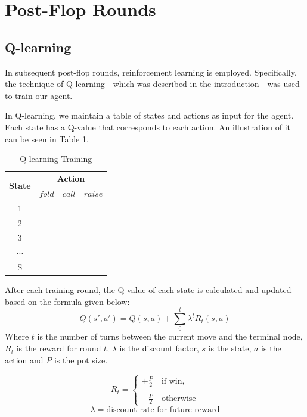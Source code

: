 \documentclass{article}
\begin{document}
\section{Post-Flop Rounds}

\subsection{Q-learning}

In subsequent post-flop rounds, reinforcement learning is employed. Specifically, the technique of Q-learning - which was described in the introduction - was used to train our agent.

In Q-learning, we maintain a table of states and actions as input for the agent. Each state has a Q-value that corresponds to each action. An illustration of it can be seen in Table 1.

\begin{table}[h!]
  \begin{center}
	\begin{tabular}{ c|c|c|c }
	\hline
	\multirow{2}{*}{\textbf{State}}&\multicolumn{3}{|c}{\textbf{Action}}\\
	\cline{2-4}
	& $fold$ & $call$ & $raise$\\ 
	\hline
	1\\
	2\\ 
	3\\ 
	$\cdots$\\
	S\\
	\hline
	\end{tabular}
	\caption{Q-learning Training}
    \label{tab:table1}
  \end{center}
\end{table}
After each training round, the Q-value of each state is calculated and updated based on the formula given below:
\begin{displaymath}
Q\left(s',a'\right)=Q\left(s,a\right)+\sum_{0}^{t}\lambda^{t}R_t\left(s,a\right)
\end{displaymath}
Where $t$ is the number of turns between the current move and the terminal node, $R_t$ is the reward for round $t$, $\lambda$ is the discount factor, $s$ is the state, $a$ is the action and $P$ is the pot size.

\begin{displaymath}
  R_t=
  \left\lbrace
  \begin{array}{l}
    +\frac{P}{2}\quad\text{if win,} \\
    \\
    -\frac{P}{2}\quad\text{otherwise}
  \end{array}
  \right.
\end{displaymath}
\begin{displaymath}
  \lambda=\text{discount rate for future reward}
\end{displaymath}
\end{document}
